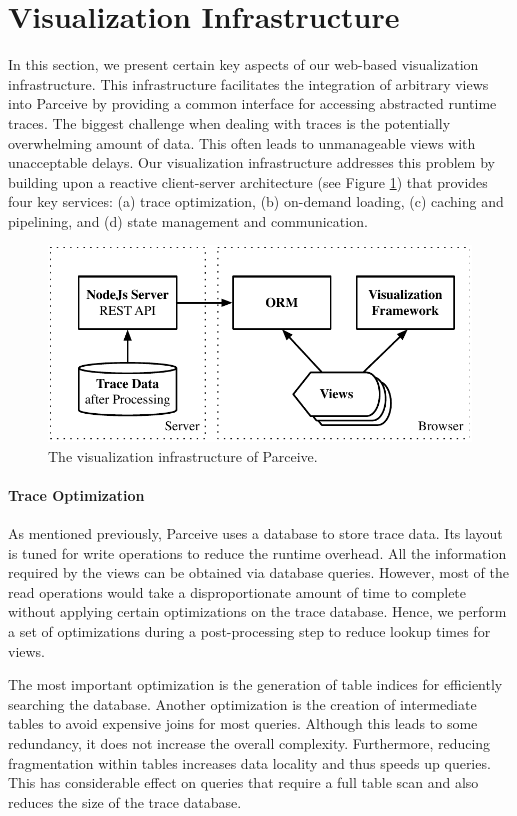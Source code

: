\section{Visualization Infrastructure}
In this section, we present certain key aspects of our web-based visualization
infrastructure. This infrastructure facilitates the integration of arbitrary
views into Parceive by providing a common interface for accessing abstracted
runtime traces. The biggest challenge when dealing with traces is the
potentially overwhelming amount of data. This often leads to unmanageable views
with unacceptable delays. Our visualization infrastructure addresses this
problem by building upon a reactive client-server architecture (see Figure
\ref{fig:visualization}) that provides four key services: (a) trace
optimization, (b) on-demand loading, (c) caching and pipelining, and (d)
state management and communication.

\begin{figure}[h!]
\includegraphics[width=\linewidth]{img/visualization_framework}
\caption{The visualization infrastructure of Parceive.}
\label{fig:visualization}
\end{figure}

\paragraph{Trace Optimization}
As mentioned previously, Parceive uses a database to store trace data. Its
layout is tuned for write operations to reduce the runtime overhead. All the
information required by the views can be obtained via database queries.
However, most of the read operations would take a disproportionate amount of
time to complete without applying certain optimizations on the trace database.
Hence, we perform a set of optimizations during a post-processing step to
reduce lookup times for views.

The most important optimization is the generation of table indices for
efficiently searching the database. Another optimization is the creation of
intermediate tables to avoid expensive joins for most queries. Although this
leads to some redundancy, it does not increase the overall complexity.
Furthermore, reducing fragmentation within tables increases data locality and
thus speeds up queries. This has considerable effect on queries that require a
full table scan and also reduces the size of the trace database.

